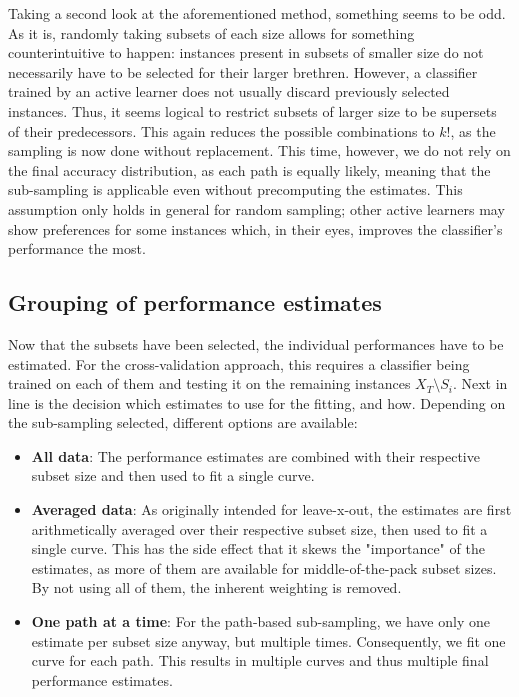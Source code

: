 Taking a second look at the aforementioned method, something seems to be odd. As it is, randomly taking subsets of each size allows for something counterintuitive to happen: instances present in subsets of smaller size do not necessarily have to be selected for their larger brethren. However, a classifier trained by an active learner does not usually discard previously selected instances. Thus, it seems logical to restrict subsets of larger size to be supersets of their predecessors. This again reduces the possible combinations to $k!$, as the sampling is now done without replacement. This time, however, we do not rely on the final accuracy distribution, as each path is equally likely, meaning that the sub-sampling is applicable even without precomputing the estimates. This assumption only holds in general for random sampling; other active learners may show preferences for some instances which, in their eyes, improves the classifier's performance the most.

\subsection{Grouping of performance estimates}
Now that the subsets have been selected, the individual performances have to be estimated. For the cross-validation approach, this requires a classifier being trained on each of them and testing it on the remaining instances $X_T \setminus S_i$. Next in line is the decision which estimates to use for the fitting, and how. Depending on the sub-sampling selected, different options are available:

\begin{itemize}
	\item \textbf{All data}: The performance estimates are combined with their respective subset size and then used to fit a single curve.
	\item \textbf{Averaged data}: As originally intended for leave-x-out, the estimates are first arithmetically averaged over their respective subset size, then used to fit a single curve. This has the side effect that it skews the "importance" of the estimates, as more of them are available for middle-of-the-pack subset sizes. By not using all of them, the inherent weighting is removed.
	\item \textbf{One path at a time}: For the path-based sub-sampling, we have only one estimate per subset size anyway, but multiple times. Consequently, we fit one curve for each path. This results in multiple curves and thus multiple final performance estimates.
\end{itemize}


